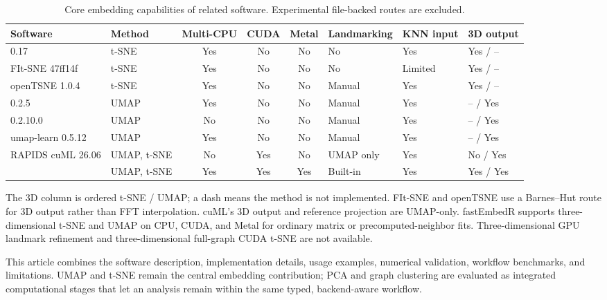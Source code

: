 \documentclass[article]{jss}
\newcommand{\fastEmbedR}{\pkg{fastEmbedR}\xspace}
\begin{document}
\begin{table}[t]
\centering
\caption{Core embedding capabilities of related software. Experimental
  file-backed routes are excluded.}
\label{tab:related-software}
\footnotesize
\renewcommand{\arraystretch}{1.15}
\setlength{\tabcolsep}{3pt}
\begin{tabular}{L{0.22\textwidth}L{0.09\textwidth}ccc
                L{0.13\textwidth}L{0.09\textwidth}L{0.09\textwidth}}
\toprule
Software & Method & Multi-CPU & CUDA & Metal & Landmarking &
  KNN input & 3D output \\
\midrule
{} 0.17 & t-SNE & Yes & No & No & No & Yes & Yes / -- \\
FIt-SNE 47ff14f & t-SNE & Yes & No & No & No & Limited & Yes / -- \\
openTSNE 1.0.4 & t-SNE & Yes & No & No & Manual & Yes & Yes / -- \\
 0.2.5 & UMAP & Yes & No & No & Manual & Yes & -- / Yes \\
 0.2.10.0 & UMAP & No & No & No & Manual & Yes & -- / Yes \\
umap-learn 0.5.12 & UMAP & Yes & No & No & Manual & Yes & -- / Yes \\
RAPIDS cuML 26.06 & UMAP, t-SNE & No & Yes & No & UMAP only &
  Yes & No / Yes \\
\fastEmbedR & UMAP, t-SNE & Yes & Yes & Yes & Built-in & Yes &
  Yes / Yes \\
\bottomrule
\end{tabular}
\par\smallskip
\parbox{0.98\textwidth}{\scriptsize The 3D column is ordered t-SNE / UMAP;
  a dash means the method is not implemented. FIt-SNE and openTSNE use a
  Barnes--Hut route for 3D output rather than FFT interpolation. cuML's
  3D output and reference projection are UMAP-only. fastEmbedR supports
  three-dimensional t-SNE and UMAP on CPU, CUDA, and Metal
  for ordinary matrix or precomputed-neighbor fits. Three-dimensional GPU
  landmark refinement and three-dimensional full-graph CUDA t-SNE
  are not available.}
\end{table}

This article combines the software description, implementation details,
usage examples, numerical validation, workflow benchmarks, and limitations.
UMAP and t-SNE remain the central embedding contribution; PCA and graph
clustering are evaluated as integrated computational stages that let an
analysis remain within the same typed, backend-aware workflow.
\end{document}
